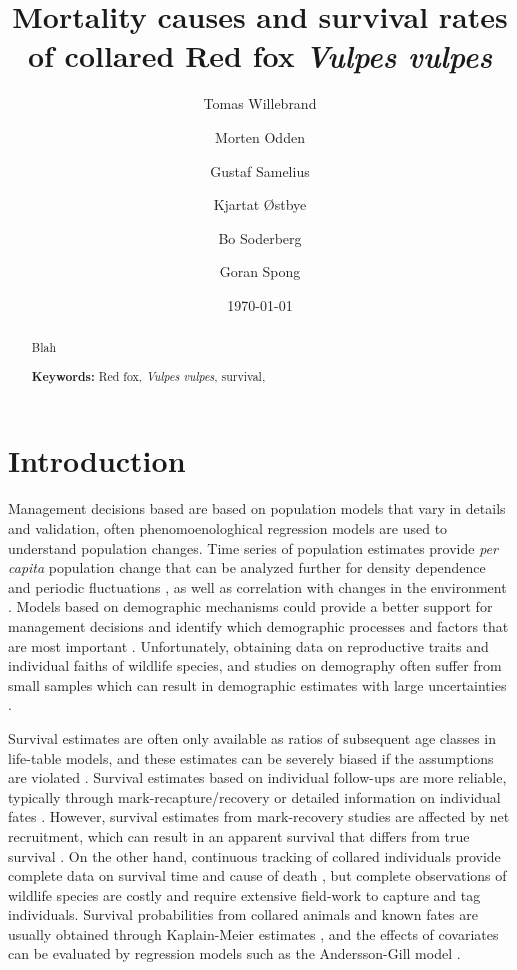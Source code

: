 \documentclass[12pt,a4paper,final,abstract=true,headings=small]{scrartcl}
\title{\textbf{Mortality causes and survival rates of collared Red fox \emph{Vulpes vulpes}}}
\author[1$*$]{Tomas Willebrand}
\author[1]{Morten Odden}
\author[2]{Gustaf Samelius}
\author[1]{Kjartat Østbye}
\author[3]{Bo Soderberg}
\author[3]{Goran Spong}
\affil[1]{Inland Norway University of Applied Sciences, Evenstad, Norway}
\affil[2]{Swedish University of Agricultural Sciences, Grimsö Wildlife
          Research Station, Sweden}
\affil[3]{Swedish University of Agricultural Sciences, Uppsala, Sweden}
\affil[$*$]{\normalfont Corresponding author:
            \href{mailto:tomas.willebrand@inn.no}{tomas.willebrand@inn.no}}
\date{\today}
\begin{document}
\maketitle

\newpage

\begin{abstract}
  Blah

  \medskip

  \noindent\textbf{Keywords:} Red fox, \emph{Vulpes vulpes},  survival,
\end{abstract}

\newpage
\section*{Introduction}


Management decisions based are based on population models that vary in details and validation, often phenomoenologhical regression models are used to understand population changes.  Time series of population estimates provide \emph{per capita} population change that can be analyzed further for density dependence and periodic fluctuations \citep{royamaAnalyticalPopulationDynamics1992d,turchinComplexPopulationDynamics2003}, as well as correlation with changes in the environment \citep{markovchick-nichollsRelationshipsHumanDisturbance2008,knapeEffectsWeatherClimate2011}. Models based on demographic mechanisms could provide a better support for management decisions and identify which demographic processes and factors that are most important \citep{lebretonDetectingEstimatingDensity2013,gaillard2003,saetherAVIANLIFEHISTORY2000}. Unfortunately, obtaining data on reproductive traits and individual faiths of wildlife species, and  studies on demography often suffer from small samples which can result in demographic estimates with large uncertainties \citep{doakUnderstandingPredictingEffects2005,popescuAssessingBiologicalRealism2016}.

Survival estimates are often only available as ratios of subsequent age classes in life-table models, and these estimates can be severely biased if the assumptions are violated \citep{andersonProblemsEstimatingAgeSpecific1985}. Survival estimates based on individual follow-ups are more reliable, typically through mark-recapture/recovery or detailed information on individual fates \citep{lebretonStatisticalAnalysisSurvival1993}. However, survival estimates from mark-recovery studies are affected by net recruitment, which can result in an apparent survival that differs from true survival \citep{schaubEstimatingTrueInstead2014}. On the other hand, continuous tracking of collared individuals provide complete data on survival time and cause of death \citep{whiteAnalysisWildlifeRadiotracking2012}, but complete observations of wildlife species are costly and require extensive field-work to capture and tag individuals. Survival probabilities from collared animals and known fates are usually obtained through Kaplain-Meier estimates \citep{pollockSurvivalAnalysisTelemetry1989}, and the effects of covariates can be evaluated by regression models such as the Andersson-Gill model \citep{andersenCoxsRegressionModel1982, murrayWildlifeSurvivalEstimation2006}.
\end{document}
